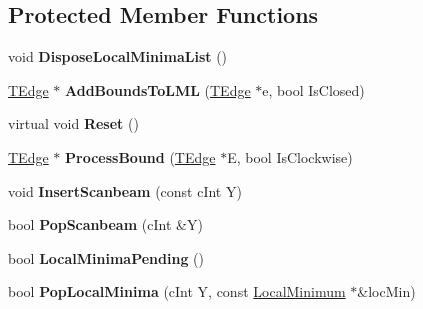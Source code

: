 \subsection*{Protected Member Functions}
\begin{DoxyCompactItemize}
\item 
\mbox{\label{class_clipper_lib_1_1_clipper_base_a311dbbec1454ab7965e363a0359f5ee4}} 
void {\bfseries Dispose\+Local\+Minima\+List} ()
\item 
\mbox{\label{class_clipper_lib_1_1_clipper_base_a906ea17c9dc8822d689e54c3243e7f58}} 
\hyperlink{struct_clipper_lib_1_1_t_edge}{T\+Edge} $\ast$ {\bfseries Add\+Bounds\+To\+L\+ML} (\hyperlink{struct_clipper_lib_1_1_t_edge}{T\+Edge} $\ast$e, bool Is\+Closed)
\item 
\mbox{\label{class_clipper_lib_1_1_clipper_base_a125febb065f23fc55dafffe8d185b642}} 
virtual void {\bfseries Reset} ()
\item 
\mbox{\label{class_clipper_lib_1_1_clipper_base_a292655c74a7e70a8b8829337c632bdf0}} 
\hyperlink{struct_clipper_lib_1_1_t_edge}{T\+Edge} $\ast$ {\bfseries Process\+Bound} (\hyperlink{struct_clipper_lib_1_1_t_edge}{T\+Edge} $\ast$E, bool Is\+Clockwise)
\item 
\mbox{\label{class_clipper_lib_1_1_clipper_base_ac22b052dbbc15b6e5e4304be72bd9ed0}} 
void {\bfseries Insert\+Scanbeam} (const c\+Int Y)
\item 
\mbox{\label{class_clipper_lib_1_1_clipper_base_acb0b72fccefe130d4dc2d3b114e4a2a6}} 
bool {\bfseries Pop\+Scanbeam} (c\+Int \&Y)
\item 
\mbox{\label{class_clipper_lib_1_1_clipper_base_ae091022ac37f757ab489e9217d2e4934}} 
bool {\bfseries Local\+Minima\+Pending} ()
\item 
\mbox{\label{class_clipper_lib_1_1_clipper_base_aeaf9a35b1e38d1559f24ead2cf211854}} 
bool {\bfseries Pop\+Local\+Minima} (c\+Int Y, const \hyperlink{struct_clipper_lib_1_1_local_minimum}{Local\+Minimum} $\ast$\&loc\+Min)

\end{DoxyCompactItemize}
